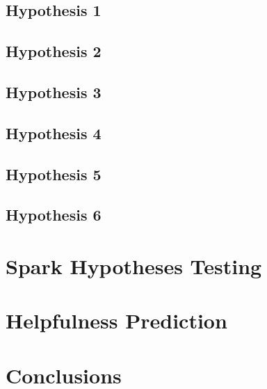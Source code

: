 \documentclass{class}
\begin{document}
\begin{multicols}{2}
    \subsection*{Hypothesis 1}
    \subsection*{Hypothesis 2}
    \subsection*{Hypothesis 3}
    \subsection*{Hypothesis 4}
    \subsection*{Hypothesis 5}
    \subsection*{Hypothesis 6}
    \section{Spark Hypotheses Testing}
    \section{Helpfulness Prediction}
    \section{Conclusions}

\end{multicols}
\end{document}
